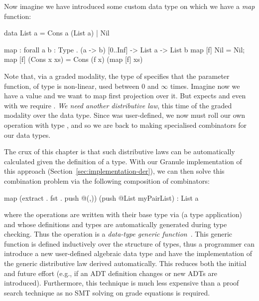 Now imagine we have introduced some custom data type  on which we
have a \emph{map} function:
%
\begin{granule}
data List a = Cons a (List a) | Nil

map : forall { a b : Type } . (a -> b) [0..Inf] -> List a -> List b
map [f] Nil = Nil;
map [f] (Cons x xs) = Cons (f x) (map [f] xs)
\end{granule}
%
Note that, via a graded modality, the type of  specifies that the
parameter function, of type  is non-linear, used between $0$ and
$\infty$ times. Imagine now we have a value  and we want to map first projection over it. But  expects
 and even with  we require . \emph{We need another distributive law}, this time of the graded modality
over the  data type. Since  was user-defined, we now
must roll our own  operation with type , and so we are back to making specialised
combinators for our data types.

The crux of this chapter is that such distributive laws can be automatically
calculated given the definition of a type. With our Granule implementation of
this approach (Section~\ref{sec:implementation-der}), we can then solve this
combination problem via the following composition of combinators:
%
\begin{granule}
map (extract . fst . push @(,)) (push @List myPairList) : List a
\end{granule}
%
where the  operations are written with their base type via
 (a type application) and whose definitions and types are
automatically generated during type checking. Thus the  operation
is a \textit{data-type generic function}~\citep{hinze2000new}. This generic
function is defined inductively over the structure of types, thus a programmer
can introduce a new user-defined algebraic data type and have the implementation
of the generic distributive law derived automatically. This reduces both the
initial and future effort (e.g., if an ADT definition changes or new ADTs are
introduced). Furthermore, this technique is much less expensive than a proof search 
technique as no SMT solving on grade equations is required. 

